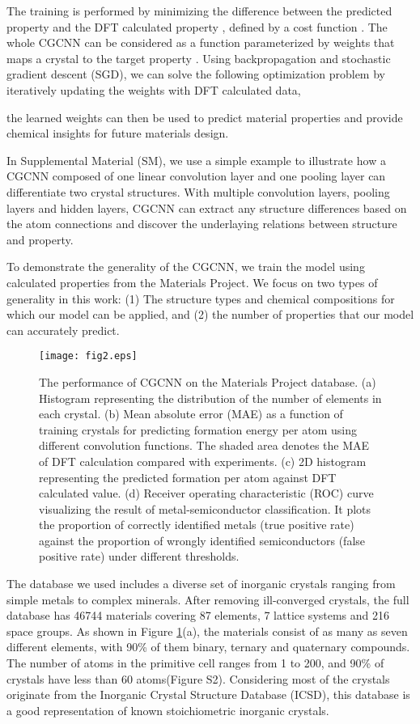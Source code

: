 \documentclass[twocolumn, prl]{revtex4-1}
\begin{document}
The training is performed by minimizing the difference between the predicted property  and the DFT calculated property , defined by a cost function . The whole CGCNN can be considered as a function  parameterized by weights  that maps a crystal  to the target property . Using backpropagation and stochastic gradient descent (SGD), we can solve the following optimization problem by iteratively updating the weights with DFT calculated data,

the learned weights can then be used to predict material properties and provide chemical insights for future materials design. 

In Supplemental Material (SM), we use a simple example to illustrate how a CGCNN composed of one linear convolution layer and one pooling layer can differentiate two crystal structures. With multiple convolution layers, pooling layers and hidden layers, CGCNN can extract any structure differences based on the atom connections and discover the underlaying relations between structure and property.

To demonstrate the generality of the CGCNN, we train the model using calculated properties from the Materials Project\cite{jain2013commentary}. We focus on two types of generality in this work: (1) The structure types and chemical compositions for which our model can be applied, and (2) the number of properties that our model can accurately predict.

\begin{figure}[tb]
  \centering
  \texttt{[image: fig2.eps]}
  \caption{The performance of CGCNN on the Materials Project database\cite{jain2013commentary}. (a) Histogram representing the distribution of the number of elements in each crystal. (b) Mean absolute error (MAE) as a function of training crystals for predicting formation energy per atom using different convolution functions. The shaded area denotes the MAE of DFT calculation compared with experiments\cite{kirklin2015open}. (c) 2D histogram representing the predicted formation per atom against DFT calculated value. (d) Receiver operating characteristic (ROC) curve visualizing the result of metal-semiconductor classification. It plots the proportion of correctly identified metals (true positive rate) against the proportion of wrongly identified semiconductors (false positive rate) under different thresholds. }
  \label{fig:prediction}
\end{figure}

The database we used includes a diverse set of inorganic crystals ranging from simple metals to complex minerals. After removing ill-converged crystals, the full database has 46744 materials covering 87 elements, 7 lattice systems and 216 space groups. As shown in Figure \ref{fig:prediction}(a), the materials consist of as many as seven different elements, with 90\% of them binary, ternary and quaternary compounds. The number of atoms in the primitive cell ranges from 1 to 200, and 90\% of crystals have less than 60 atoms(Figure S2).  Considering most of the crystals originate from the Inorganic Crystal Structure Database (ICSD)\cite{hellenbrandt2004inorganic}, this database is a good representation of known stoichiometric inorganic crystals.
\end{document}

